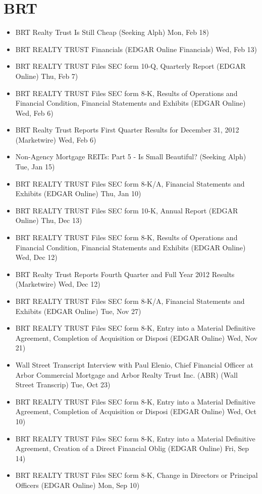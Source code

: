 \documentclass[11pt,asymmetric]{article}
\begin{document}
\section*{BRT}
\begin{itemize}
\item BRT Realty Trust Is Still Cheap (Seeking Alph) Mon, Feb 18)
\item BRT REALTY TRUST Financials (EDGAR Online Financials) Wed, Feb 13)
\item BRT REALTY TRUST Files SEC form 10-Q, Quarterly Report (EDGAR Online) Thu, Feb 7)
\item BRT REALTY TRUST Files SEC form 8-K, Results of Operations and Financial Condition, Financial Statements and Exhibits (EDGAR Online) Wed, Feb 6)
\item BRT Realty Trust Reports First Quarter Results for December 31, 2012 (Marketwire) Wed, Feb 6)
\item Non-Agency Mortgage REITs: Part 5 - Is Small Beautiful? (Seeking Alph) Tue, Jan 15)
\item BRT REALTY TRUST Files SEC form 8-K/A, Financial Statements and Exhibits (EDGAR Online) Thu, Jan 10)
\item BRT REALTY TRUST Files SEC form 10-K, Annual Report (EDGAR Online) Thu, Dec 13)
\item BRT REALTY TRUST Files SEC form 8-K, Results of Operations and Financial Condition, Financial Statements and Exhibits (EDGAR Online) Wed, Dec 12)
\item BRT Realty Trust Reports Fourth Quarter and Full Year 2012 Results (Marketwire) Wed, Dec 12)
\item BRT REALTY TRUST Files SEC form 8-K/A, Financial Statements and Exhibits (EDGAR Online) Tue, Nov 27)
\item BRT REALTY TRUST Files SEC form 8-K, Entry into a Material Definitive Agreement, Completion of Acquisition or Disposi (EDGAR Online) Wed, Nov 21)
\item Wall Street Transcript Interview with Paul Elenio, Chief Financial Officer at Arbor Commercial Mortgage and Arbor Realty Trust Inc. (ABR) (Wall Street Transcrip) Tue, Oct 23)
\item BRT REALTY TRUST Files SEC form 8-K, Entry into a Material Definitive Agreement, Completion of Acquisition or Disposi (EDGAR Online) Wed, Oct 10)
\item BRT REALTY TRUST Files SEC form 8-K, Entry into a Material Definitive Agreement, Creation of a Direct Financial Oblig (EDGAR Online) Fri, Sep 14)
\item BRT REALTY TRUST Files SEC form 8-K, Change in Directors or Principal Officers (EDGAR Online) Mon, Sep 10)

\end{itemize}
\end{document}
